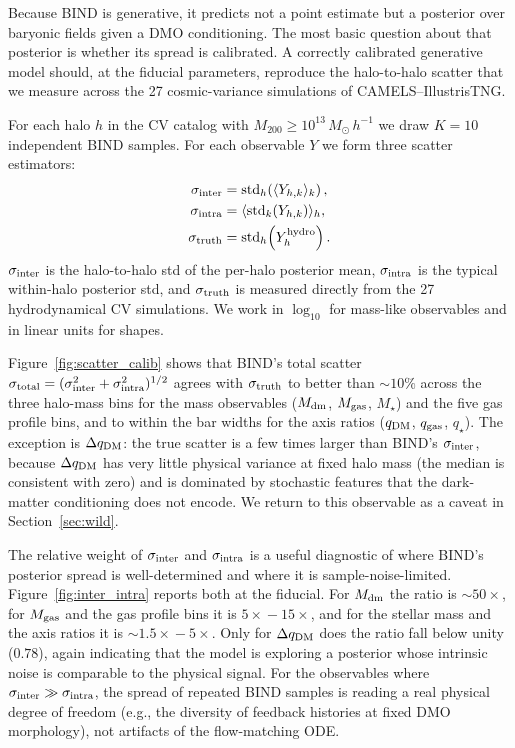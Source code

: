 \documentclass[linenumbers,trackchanges, twocolumn]{aastex701}
\begin{document}
Because \textsc{BIND} is generative, it predicts not a point estimate but a posterior over baryonic fields given a DMO conditioning. The most basic question about that posterior is whether its spread is calibrated. A correctly calibrated generative model should, at the fiducial parameters, reproduce the halo-to-halo scatter that we measure across the 27 cosmic-variance simulations of CAMELS--IllustrisTNG.

For each halo $h$ in the CV catalog with $M_{200}\geq 10^{13}\,M_\odot\,h^{-1}$ we draw $K=10$ independent \textsc{BIND} samples. For each observable $Y$ we form three scatter estimators:
\begin{align}
\sigma_{\rm inter} &= \mathrm{std}_h\!\left(\langle Y_{h,k}\rangle_k\right), \\
\sigma_{\rm intra} &= \langle \mathrm{std}_k(Y_{h,k})\rangle_h, \\
\sigma_{\rm truth} &= \mathrm{std}_h\!\left(Y_h^{\rm hydro}\right).
\end{align}
$\sigma_{\rm inter}$ is the halo-to-halo std of the per-halo posterior mean, $\sigma_{\rm intra}$ is the typical within-halo posterior std, and $\sigma_{\rm truth}$ is measured directly from the 27 hydrodynamical CV simulations. We work in $\log_{10}$ for mass-like observables and in linear units for shapes.

Figure~\ref{fig:scatter_calib} shows that \textsc{BIND}'s total scatter $\sigma_{\rm total}=(\sigma_{\rm inter}^2+\sigma_{\rm intra}^2)^{1/2}$ agrees with $\sigma_{\rm truth}$ to better than $\sim\!10\%$ across the three halo-mass bins for the mass observables ($M_{\rm dm}$, $M_{\rm gas}$, $M_\star$) and the five gas profile bins, and to within the bar widths for the axis ratios ($q_{\rm DM}$, $q_{\rm gas}$, $q_\star$). The exception is $\Delta q_{\rm DM}$: the true scatter is a few times larger than \textsc{BIND}'s $\sigma_{\rm inter}$, because $\Delta q_{\rm DM}$ has very little physical variance at fixed halo mass (the median is consistent with zero) and is dominated by stochastic features that the dark-matter conditioning does not encode. We return to this observable as a caveat in Section~\ref{sec:wild}.

The relative weight of $\sigma_{\rm inter}$ and $\sigma_{\rm intra}$ is a useful diagnostic of where \textsc{BIND}'s posterior spread is well-determined and where it is sample-noise-limited. Figure~\ref{fig:inter_intra} reports both at the fiducial. For $M_{\rm dm}$ the ratio is $\sim\!50\!\times$, for $M_{\rm gas}$ and the gas profile bins it is $5\!\times\!-\!15\!\times$, and for the stellar mass and the axis ratios it is $\sim\!1.5\!\times\!-\!5\!\times$. Only for $\Delta q_{\rm DM}$ does the ratio fall below unity ($0.78$), again indicating that the model is exploring a posterior whose intrinsic noise is comparable to the physical signal. For the observables where $\sigma_{\rm inter}\gg\sigma_{\rm intra}$, the spread of repeated \textsc{BIND} samples is reading a real physical degree of freedom (e.g., the diversity of feedback histories at fixed DMO morphology), not artifacts of the flow-matching ODE.
\end{document}

